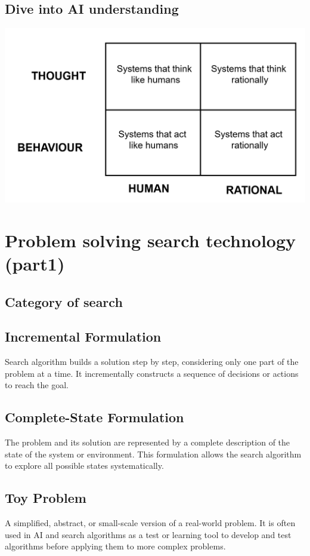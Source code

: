 \documentclass[a4paper, 12pt]{article}
\begin{document}
    \subsection{Dive into AI understanding}
    \includegraphics[width=\textwidth]{w1_1.png}

    \section{Problem solving search technology (part1)}
    \subsection{Category of search}
        \subsection*{Incremental Formulation}
        Search algorithm builds a solution step by step, considering only one part of the problem at a time. It incrementally constructs a sequence of decisions or actions to reach the goal.
        \subsection*{Complete-State Formulation}
        The problem and its solution are represented by a complete description of the state of the system or environment. This formulation allows the search algorithm to explore all possible states systematically.
        \subsection*{Toy Problem}
        A simplified, abstract, or small-scale version of a real-world problem. It is often used in AI and search algorithms as a test or learning tool to develop and test algorithms before applying them to more complex problems.
\end{document}
